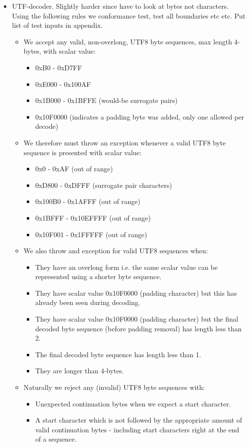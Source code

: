 \begin{itemize}
    \item UTF-decoder. Slightly harder since have to look at bytes not characters. Using the following rules we conformance test, test all boundaries etc etc. Put list of test inputs in appendix.
    \begin{itemize}
        \item We accept any valid, non-overlong, UTF8 byte sequences, max length 4-bytes, with scalar value:
        \begin{itemize}
            \item 0xB0 - 0xD7FF
            \item 0xE000 - 0x100AF
            \item 0x1B000 - 0x1BFFE (would-be surrogate pairs)
            \item 0x10F0000 (indicates a padding byte was added, only one allowed per decode)
        \end{itemize}
        \item We therefore must throw an exception whenever a valid UTF8 byte sequence is presented with scalar value:
        \begin{itemize}
            \item 0x0 - 0xAF (out of range)
            \item 0xD800 - 0xDFFF (surrogate pair characters)
            \item 0x100B0 - 0x1AFFF (out of range)
            \item 0x1BFFF - 0x10EFFFF (out of range)
            \item 0x10F001 - 0x1FFFFF (out of range)
        \end{itemize}
        \item We also throw and exception for valid UTF8 sequences when:
        \begin{itemize}
            \item They have an overlong form i.e. the same scalar value can be represented using a shorter byte sequence.
            \item They have scalar value 0x10F0000 (padding character) but this has already been seen during decoding.
            \item They have scalar value 0x10F0000 (padding character) but the final decoded byte sequence (before padding removal) has length less than 2.
            \item The final decoded byte sequence has length less than 1.
            \item They are longer than 4-bytes.
        \end{itemize}
        \item Naturally we reject any (invalid) UTF8 byte sequences with:
        \begin{itemize}
            \item Unexpected continuation bytes when we expect a start character.
            \item A start character which is not followed by the appropriate amount of valid continuation bytes - including start characters right at the end of a sequence.
        \end{itemize}
            

\end{itemize}
\end{itemize}
